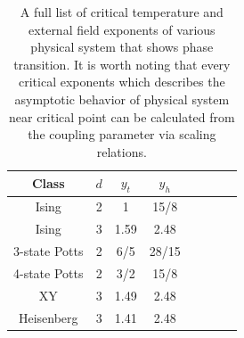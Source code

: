 \documentclass[%
 reprint,
 amsmath,amssymb,
 aps,
]{revtex4-2}
\begin{document}
\begin{table}[b]
\caption{\label{tab:exponent}
A full list of critical temperature and external field exponents of various physical system 
that shows phase transition. It is worth noting that every critical exponents which 
describes the asymptotic behavior of physical system near critical point can be calculated
from the coupling parameter via scaling relations.}
\begin{ruledtabular}
\begin{tabular}{cccccccc}
Class &$d$ &$y_{t}$ &$y_{h}$\\
\hline
Ising & 2 & 1 & 15/8 \\
Ising & 3 & 1.59 & 2.48 \\
3-state Potts & 2 & 6/5 & 28/15 \\
4-state Potts & 2 & 3/2 & 15/8 \\
XY & 3 & 1.49 & 2.48 \\
Heisenberg & 3 & 1.41 & 2.48 \\
\end{tabular}
\end{ruledtabular}
\end{table}

% 
\end{document}
